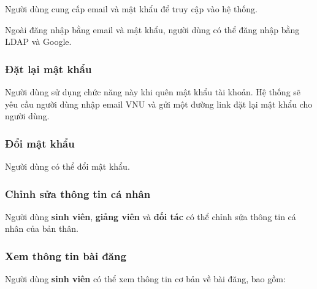 \documentclass[./../main.tex]{subfiles}
\begin{document}
  Người dùng cung cấp email và mật khẩu để truy cập vào hệ thống.
  
  Ngoài đăng nhập bằng email và mật khẩu, người dùng có thể đăng nhập bằng
  LDAP và Google.
  
  \hypertarget{ux111ux1eb7t-lux1ea1i-mux1eadt-khux1ea9u}{%
  \subsubsection{Đặt lại mật
  khẩu}\label{ux111ux1eb7t-lux1ea1i-mux1eadt-khux1ea9u}}
  
  Người dùng sử dụng chức năng này khi quên mật khẩu tài khoản. Hệ thống
  sẽ yêu cầu người dùng nhập email VNU và gửi một đường link đặt lại mật
  khẩu cho người dùng.
  
  \hypertarget{ux111ux1ed5i-mux1eadt-khux1ea9u}{%
  \subsubsection{Đổi mật khẩu}\label{ux111ux1ed5i-mux1eadt-khux1ea9u}}
  
  Người dùng có thể đổi mật khẩu.
  
  \hypertarget{chux1ec9nh-sux1eeda-thuxf4ng-tin-cuxe1-nhuxe2n}{%
  \subsubsection{Chỉnh sửa thông tin cá
  nhân}\label{chux1ec9nh-sux1eeda-thuxf4ng-tin-cuxe1-nhuxe2n}}
  
  Người dùng \textbf{sinh viên}, \textbf{giảng viên} và \textbf{đối tác}
  có thể chỉnh sửa thông tin cá nhân của bản thân.
  
  \hypertarget{xem-thuxf4ng-tin-buxe0i-ux111ux103ng}{%
  \subsubsection{Xem thông tin bài
  đăng}\label{xem-thuxf4ng-tin-buxe0i-ux111ux103ng}}
  
  Người dùng \textbf{sinh viên} có thể xem thông tin cơ bản về bài đăng,
  bao gồm:
  
\end{document}
